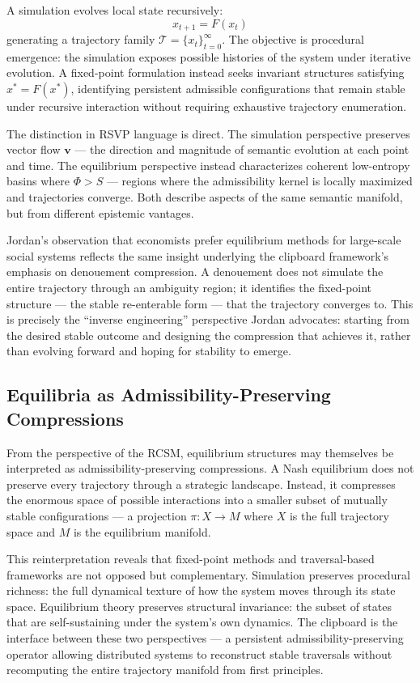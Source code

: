 \documentclass[12pt,oneside]{book}
\theoremstyle{plain}
\theoremstyle{definition}
\theoremstyle{plain}
\begin{document}
A simulation evolves local state recursively:
\[
x_{t+1} = F(x_t)
\]
generating a trajectory family $\mathcal{T} = \{x_t\}_{t=0}^\infty$. The objective is procedural emergence: the simulation exposes possible histories of the system under iterative evolution. A fixed-point formulation instead seeks invariant structures satisfying $x^* = F(x^*)$, identifying persistent admissible configurations that remain stable under recursive interaction without requiring exhaustive trajectory enumeration.

The distinction in RSVP language is direct. The simulation perspective preserves vector flow $\mathbf{v}$ — the direction and magnitude of semantic evolution at each point and time. The equilibrium perspective instead characterizes coherent low-entropy basins where $\Phi > S$ — regions where the admissibility kernel is locally maximized and trajectories converge. Both describe aspects of the same semantic manifold, but from different epistemic vantages.

Jordan's observation that economists prefer equilibrium methods for large-scale social systems reflects the same insight underlying the clipboard framework's emphasis on denouement compression. A denouement does not simulate the entire trajectory through an ambiguity region; it identifies the fixed-point structure — the stable re-enterable form — that the trajectory converges to. This is precisely the ``inverse engineering'' perspective Jordan advocates: starting from the desired stable outcome and designing the compression that achieves it, rather than evolving forward and hoping for stability to emerge.

\subsection{Equilibria as Admissibility-Preserving Compressions}

From the perspective of the RCSM, equilibrium structures may themselves be interpreted as admissibility-preserving compressions. A Nash equilibrium does not preserve every trajectory through a strategic landscape. Instead, it compresses the enormous space of possible interactions into a smaller subset of mutually stable configurations --- a projection $\pi : X \to M$ where $X$ is the full trajectory space and $M$ is the equilibrium manifold.

This reinterpretation reveals that fixed-point methods and traversal-based frameworks are not opposed but complementary. Simulation preserves procedural richness: the full dynamical texture of how the system moves through its state space. Equilibrium theory preserves structural invariance: the subset of states that are self-sustaining under the system's own dynamics. The clipboard is the interface between these two perspectives --- a persistent admissibility-preserving operator allowing distributed systems to reconstruct stable traversals without recomputing the entire trajectory manifold from first principles.
\end{document}
